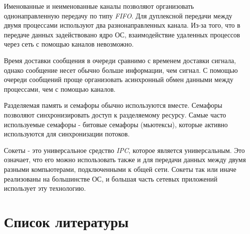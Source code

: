 \documentclass[14pt,a4paper,report]{report}
\begin{document}
Именованные и неименованные каналы позволяют организовать однонаправленную передачу по типу \emph{FIFO}. Для дуплексной передачи между двумя процессами используют два разнонаправленных канала. Из-за того, что в передаче данных задействовано ядро ОС, взаимодействие удаленных процессов через сеть с помощью каналов невозможно.

Время доставки сообщения в очереди сравнимо с временем доставки сигнала, однако сообщение несет обычно больше информации, чем сигнал. С помощью очереди сообщений проще организовать асинхронный обмен данными между процессами, чем с помощью каналов.

Разделяемая память и семафоры обычно используются вместе. Семафоры позволяют синхронизировать доступ к разделяемому ресурсу. Самые часто используемые семафоры - битовые семафоры (мьютексы), которые активно используются для синхронизации потоков.

Сокеты - это универсальное средство \emph{IPC}, которое является универсальным. Это означает, что его можно использовать также и для передачи данных между двумя разными компьютерами, подключенными к общей сети. Сокеты так или иначе реализованы на большинстве ОС, и большая часть сетевых  приложений использует эту технологию.

\clearpage

\section{Список литературы}
\end{document}
